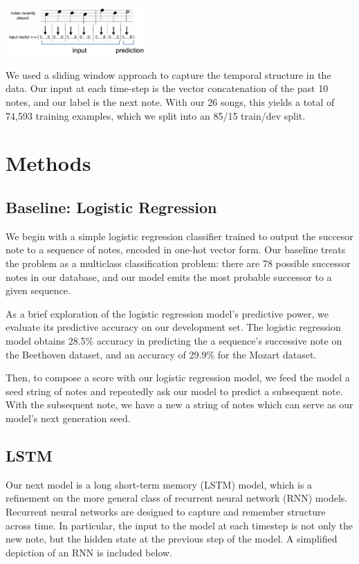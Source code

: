 \documentclass[twoside,twocolumn]{article}
\begin{document}
\includegraphics[width = 0.4\textwidth]{one-hot-encoding}

We used a sliding window approach to capture the temporal structure in the data. Our input at each time-step is the vector concatenation of the past 10 notes, and our label is the next note. With our 26 songs, this yields a total of 74,593 training examples, which we split into an 85/15 train/dev split.



\section{Methods}

\subsection{Baseline: Logistic Regression}

We begin with a simple logistic regression classifier trained to output the succesor note to a sequence of notes, encoded in one-hot vector form. Our baseline treats the problem as a multiclass classification problem: there are 78 possible successor notes in our database, and our model emits the most probable successor to a given sequence.

As a brief exploration of the logistic regression model's predictive power, we evaluate its predictive accuracy on our development set. The logistic regression model obtains 28.5\% accuracy in predicting the a sequence's successive note on the Beethoven dataset, and an accuracy of 29.9\% for the Mozart dataset.

Then, to compose a score with our logistic regression model, we feed the model a seed string of notes and repeatedly ask our model to predict a subsequent note. With the subsequent note, we have a new a string of notes which can serve as our model's next generation seed.

\subsection{LSTM}

Our next model is a long short-term memory (LSTM) model, which is a refinement on the more general class of recurrent neural network (RNN) models. Recurrent neural networks are designed to capture and remember structure across time. In particular, the input to the model at each timestep is not only the new note, but the hidden state at the previous step of the model. A simplified depiction of an RNN is included below.
\end{document}
